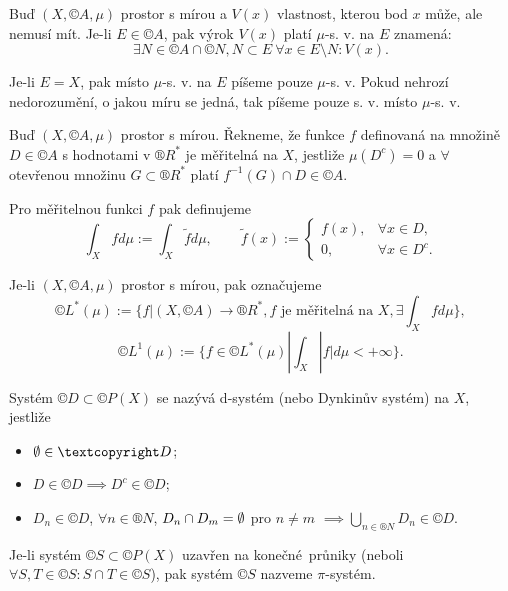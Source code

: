 \documentclass[12pt]{article}					%
\begin{document}
\begin{definice}
	Buď $(X, ©A, \mu)$ prostor s mírou a $V(x)$ vlastnost, kterou bod $x$ může, ale nemusí mít. Je-li $E \in ©A$, pak výrok $V(x)$ platí $\mu$-s. v. na $E$ znamená:
	$$ \exists N \in ©A \cap ©N, N \subset E\ \forall x \in E \setminus N: V(x). $$

	Je-li $E = X$, pak místo $\mu$-s. v. na $E$ píšeme pouze $\mu$-s. v. Pokud nehrozí nedorozumění, o jakou míru se jedná, tak píšeme pouze s. v. místo $\mu$-s. v.
\end{definice}

\begin{definice}
	Buď $(X, ©A, \mu)$ prostor s mírou. Řekneme, že funkce $f$ definovaná na množině $D \in ©A$ s hodnotami v $®R^*$ je měřitelná na $X$, jestliže $\mu(D^c) = 0$ a $\forall$ otevřenou množinu $G \subset ®R^*$ platí $f^{-1}(G) \cap D \in ©A$.

	Pro měřitelnou funkci $f$ pak definujeme
	$$ \int_X f d\mu := \int_X \tilde f d\mu, \qquad \tilde f(x) := \begin{cases}f(x), & \forall x \in D, \\ 0, & \forall x \in D^c.\end{cases} $$
\end{definice}

\begin{definice}[$©L^*$ a $©L^1$]
	Je-li $(X, ©A, \mu)$ prostor s mírou, pak označujeme
	$$ ©L^*(\mu) := \{f | (X, ©A) \rightarrow ®R^*, f \text{ je měřitelná na } X, \exists \int_X f d\mu\}, $$
	$$ ©L^1(\mu) := \{f \in ©L^*(\mu) | \int_X |f| d\mu < +∞\}. $$
\end{definice}



\begin{definice}
	Systém $©D \subset ©P(X)$ se nazývá d-systém (nebo Dynkinův systém) na $X$, jestliže

	\begin{itemize}
		\item $\O \in ©D$;
		\item $D \in ©D \implies D^c \in ©D$;
		\item $D_n \in ©D$, $\forall n \in ®N$, $D_n \cap D_m = \emptyset$ pro $n ≠ m$ $\implies \bigcup_{n \in ®N}D_n \in ©D$.
	\end{itemize}
\end{definice}

\begin{definice}[$\pi$-systém]
	Je-li systém $©S \subset ©P(X)$ uzavřen na konečné průniky (neboli $\forall S, T \in ©S: S \cap T \in ©S$), pak systém $©S$ nazveme $\pi$-systém.
\end{definice}
\end{document}
